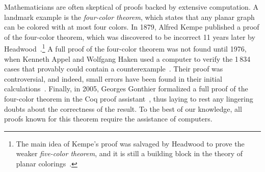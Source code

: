 Mathematicians are often skeptical of proofs backed by extensive computation.
A landmark example is the \emph{four-color theorem}, which states that any planar graph can be colored with at most four colors. 
In 1879, Alfred Kempe published a proof of the four-color theorem, which was discovered to be incorrect 11 years later by Headwood~\cite{Walters2004ItAT,Wilson2002GraphsCA}.\footnote{The main idea of Kempe's proof was salvaged by Headwood to prove the weaker \emph{five-color theorem}, and it is still a building block in the theory of planar colorings~\cite{Walters2004ItAT}.} 
A full proof of the four-color theorem was not found until 1976, when Kenneth Appel and Wolfgang Haken used a computer to verify the 1\,834 cases that provably could contain a counterexample~\cite{appelFourColorProblem1978}.
Their proof was controversial, and indeed, small errors have been found in their initial calculations~\cite{Walters2004ItAT,Wilson2002GraphsCA}.
Finally, in 2005, Georges Gonthier formalized a full proof of the four-color theorem in the \textsf{Coq} proof assistant~\cite{gonthierFourColourTheorem2008a}, thus laying to rest any lingering doubts about the correctness of the result. To the best of our knowledge, all proofs known for this theorem require the assistance of computers.

